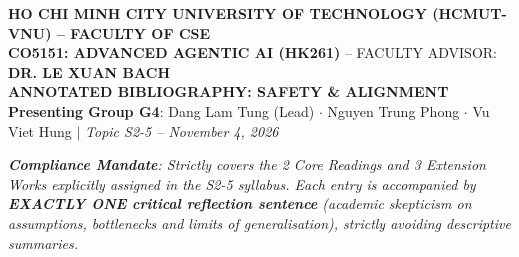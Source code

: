 \documentclass[10pt,a4paper]{article}
\begin{document}
\begin{center}
  {\footnotesize \textbf{HO CHI MINH CITY UNIVERSITY OF TECHNOLOGY (HCMUT-VNU) -- FACULTY OF CSE}}\\[0.04cm]
  {\small \textbf{CO5151: ADVANCED AGENTIC AI (HK261)} -- FACULTY ADVISOR: \textbf{DR. LE XUAN BACH}}\\[0.12cm]
  {\large\bfseries\color{hcmutblue} ANNOTATED BIBLIOGRAPHY: SAFETY \& ALIGNMENT}\\[0.04cm]
  {\footnotesize \textbf{Presenting Group G4}: Dang Lam Tung (Lead) $\cdot$ Nguyen Trung Phong $\cdot$ Vu Viet Hung $\vert$ \textit{Topic S2-5 -- November 4, 2026}}
\end{center}

\vspace{-0.15cm}
\noindent\textit{\footnotesize \textbf{Compliance Mandate}: Strictly covers the 2 Core Readings and 3 Extension Works explicitly assigned in the S2-5 syllabus. Each entry is accompanied by \textbf{EXACTLY ONE critical reflection sentence} (academic skepticism on assumptions, bottlenecks and limits of generalisation), strictly avoiding descriptive summaries.}
\end{document}
